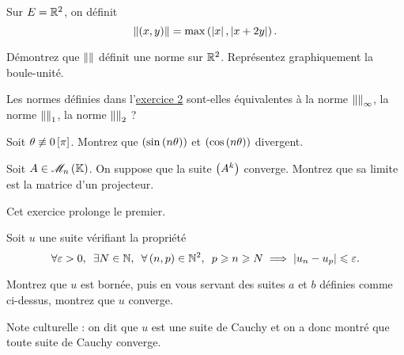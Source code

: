 \begin{exos}[Exercice 3]
Sur \(E=\mathbb{R}^2\), on définit \[\left\|\left(x,y\right)\right\|=\max\left(\left\lvert x\right\rvert,\left\lvert x+2y\right\rvert\right).\]

Démontrez que \(\left\|\right\|\) définit une norme sur \(\mathbb{R}^2\). Représentez graphiquement la boule-unité.
\end{exos}

\begin{corr}
\end{corr}

\begin{exopss}[Exercice 4]
Les normes définies dans l'\hyperref[exo:1.2]{exercice 2} sont-elles équivalentes à la norme \(\left\|\right\|_\infty\), la norme \(\left\|\right\|_1\), la norme \(\left\|\right\|_2\) ?
\end{exopss}

\begin{corr}
\end{corr}

\begin{exops}[Exercice 5]
Soit \(\theta\not\equiv0\left[\pi\right]\). Montrez que \(\left(\sin\left(n\theta\right)\right)\) et \(\left(\cos\left(n\theta\right)\right)\) divergent.
\end{exops}

\begin{corr}
\end{corr}

\begin{exops}[Exercice 6]
Soit \(A\in\M{n}\). On suppose que la suite \(\left(A^k\right)\) converge. Montrez que sa limite est la matrice d'un projecteur.
\end{exops}

\begin{corr}
\end{corr}

\begin{exoss}[Exercice 7]
Cet exercice prolonge le premier.

Soit \(u\) une suite vérifiant la propriété \[\quantifs{\forall\epsilon>0;\exists N\in\N;\forall\paren{n,p}\in\N^2}p\geq n\geq N\imp\abs{u_n-u_p}\leq\epsilon.\]

Montrez que \(u\) est bornée, puis en vous servant des suites \(a\) et \(b\) définies comme ci-dessus, montrez que \(u\) converge.

Note culturelle : on dit que \(u\) est une suite de Cauchy et on a donc montré que toute suite de Cauchy converge.
\end{exoss}


